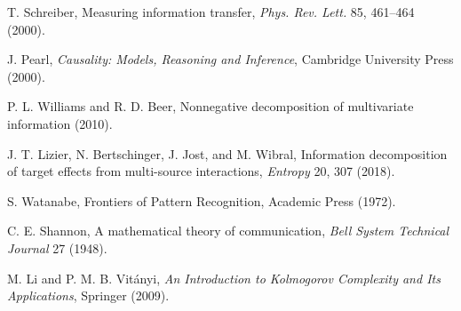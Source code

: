 \documentclass[11pt]{article}
\begin{document}
\noindent T. Schreiber, Measuring information transfer, \textit{Phys. Rev. Lett.} 85, 461--464 (2000).

\noindent J. Pearl, \textit{Causality: Models, Reasoning and Inference}, Cambridge University Press (2000).

\noindent P. L. Williams and R. D. Beer, Nonnegative decomposition of multivariate information (2010).

\noindent J. T. Lizier, N. Bertschinger, J. Jost, and M. Wibral, Information decomposition of target effects from multi-source interactions, \textit{Entropy} 20, 307 (2018).

\noindent S. Watanabe, Frontiers of Pattern Recognition, Academic Press (1972).

\noindent C. E. Shannon, A mathematical theory of communication, \textit{Bell System Technical Journal} 27 (1948).

\noindent M. Li and P. M. B. Vit\'anyi, \textit{An Introduction to Kolmogorov Complexity and Its Applications}, Springer (2009).
\end{document}
